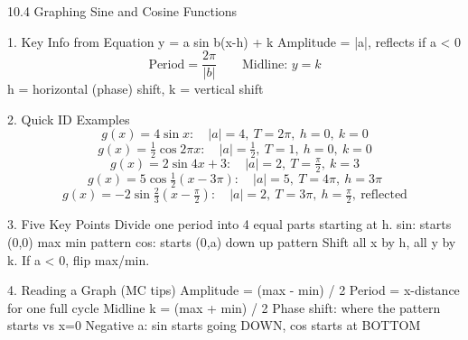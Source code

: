 10.4 Graphing Sine and Cosine Functions

1. Key Info from Equation  y = a sin b(x-h) + k
Amplitude = |a|, reflects if a < 0
$$ \text{Period} = \frac{2\pi}{|b|} \qquad \text{Midline: } y = k $$
h = horizontal (phase) shift, k = vertical shift

2. Quick ID Examples
$$ g(x) = 4\sin x: \quad |a|=4,\ T=2\pi,\ h=0,\ k=0 $$
$$ g(x) = \tfrac{1}{2}\cos 2\pi x: \quad |a|=\tfrac{1}{2},\ T=1,\ h=0,\ k=0 $$
$$ g(x) = 2\sin 4x+3: \quad |a|=2,\ T=\tfrac{\pi}{2},\ k=3 $$
$$ g(x) = 5\cos\tfrac{1}{2}(x-3\pi): \quad |a|=5,\ T=4\pi,\ h=3\pi $$
$$ g(x) = -2\sin\tfrac{2}{3}(x-\tfrac{\pi}{2}): \quad |a|=2,\ T=3\pi,\ h=\tfrac{\pi}{2},\ \text{reflected} $$

3. Five Key Points
Divide one period into 4 equal parts starting at h.
sin: starts (0,0) max min pattern
cos: starts (0,a) down up pattern
Shift all x by h, all y by k. If a < 0, flip max/min.

4. Reading a Graph (MC tips)
Amplitude = (max - min) / 2
Period = x-distance for one full cycle
Midline k = (max + min) / 2
Phase shift: where the pattern starts vs x=0
Negative a: sin starts going DOWN, cos starts at BOTTOM
